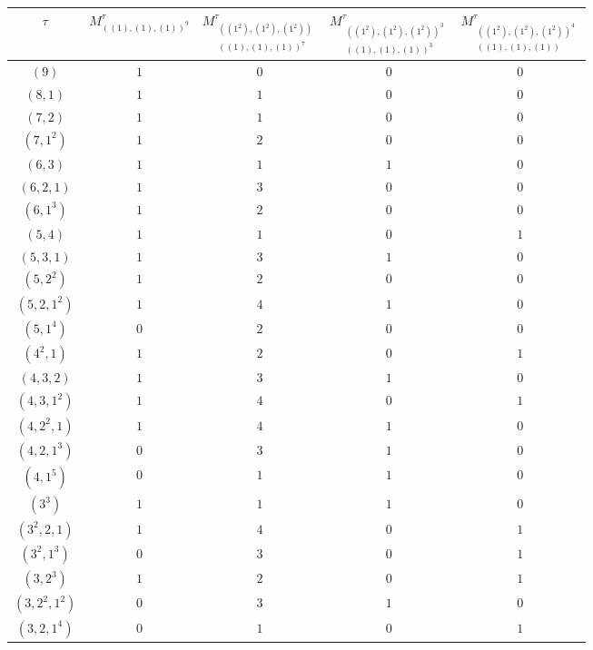  
		\begin{figure} [H]
			\centering
			\begin{tabular}{|c|c|c|c|c|}
				\hline
				$\tau$ &$M_{((1),(1),(1))^9}^\tau$ 
				& $M_{\substack{((1^2),(1^2),(1^2))\\ ((1),(1),(1))^7}}^\tau$ 
				&$M_{\substack{((1^2),(1^2),(1^2))^3\\ ((1),(1),(1))^3}}^\tau$
				&$M_{\substack{((1^2),(1^2),(1^2))^4\\ ((1),(1),(1)) }}^\tau$\\ \hline
				$(9)$ & $1$ &$0$&$0$&$0$\\ \hline
				$(8,1)$ & $1$ &$1$&$0$&$0$\\ \hline
				$(7,2)$ & $1$ &$1$&$0$&$0$\\ \hline
				$(7,1^2)$ & $1$ &$2$&$0$&$0$\\ \hline
				$(6,3)$ & $1$ &$1$&$1$&$0$\\ \hline
				$(6,2,1)$ & $1$ &$3$&$0$&$0$\\ \hline
				$(6,1^3)$ & $1$ &$2$&$0$&$0$\\ \hline
					$(5,4)$ & $1$ &$1$&$0$&$1$\\ \hline
				$(5,3,1)$ & $1$ &$3$&$1$&$0$\\ \hline
				$(5,2^2)$ & $1$ &$2$&$0$&$0$\\ \hline
				$(5,2,1^2)$ & $1$ &$4$&$1$&$0$\\ \hline
					$(5,1^4)$ & $0$ &$2$&$0$&$0$\\ \hline
				$(4^2,1)$ & $1$ &$2$&$0$&$1$\\ \hline
				$(4,3,2)$ & $1$ &$3$&$1$&$0$\\ \hline
				$(4,3,1^2)$ & $1$ &$4$&$0$&$1$\\ \hline
				$(4,2^2,1)$ & $1$ &$4$&$1$&$0$\\ \hline
				$(4,2,1^3)$ & $0$ & $3$&$1$&$0$\\ \hline
					$(4,1^5)$ & $0$ &$1$&$1$&$0$\\ \hline
				$(3^3)$ & $1$ &$1$&$1$&$0$\\ \hline
				$(3^2,2,1)$ & $1$ &$4$&$0$&$1$\\ \hline
				$(3^2,1^3)$ & $0$ &$3$&$0$&$1$\\ \hline	
				$(3,2^3)$ & $1$ &$2$&$0$&$1$\\ \hline
				$(3,2^2,1^2)$ & $0$ &$3$&$1$  &$0$\\ \hline
					$(3,2,1^4)$ & $0$ &$1$&$0$&$1$\\ \hline
				\end{tabular}
\end{figure}
